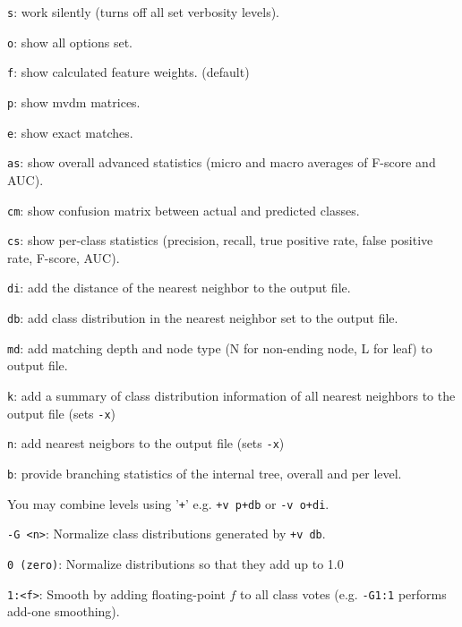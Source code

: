 \documentclass{report}
\begin{document}
\begin{description}
	\begin{description}
         \item {\tt s}:  work silently (turns off all set verbosity levels).
         \item {\tt o}:  show all options set.
         \item {\tt f}:  show calculated feature weights. (default)
         \item {\tt p}:  show {\sc mvdm} matrices.
         \item {\tt e}:  show exact matches.
         \item {\tt as}: show overall advanced statistics (micro and macro averages of F-score and AUC).
	 \item {\tt cm}: show confusion matrix between actual and predicted classes.
         \item {\tt cs}: show per-class statistics (precision, recall, true positive rate, false positive rate, F-score, AUC).
         \item {\tt di}: add the distance of the nearest neighbor to the output file.
         \item {\tt db}: add class distribution in the nearest neighbor set to the output file.
         \item {\tt md}: add matching depth and node type (N for non-ending
           node, L for leaf) to output file.
	 \item {\tt k}:  add a summary of class distribution information of all nearest neighbors to the output file (sets {\tt -x})
         \item {\tt n}:  add nearest neigbors to the output file (sets {\tt -x})
         \item {\tt b}:  provide branching statistics of the internal tree, overall and per level.
	\end{description}

        You may combine levels using '{\tt +}' e.g. {\tt +v p+db} or
        {\tt -v o+di}.

\item {\tt -G <n>}: Normalize class distributions generated by {\tt +v db}.
  \begin{description}
    \item {\tt 0 (zero)}: Normalize distributions so that they add up to 1.0
    \item {\tt 1:<f>}: Smooth by adding floating-point $f$ to all class votes (e.g. {\tt -G1:1} performs add-one smoothing).
  \end{description}


\end{description}
\end{document}
